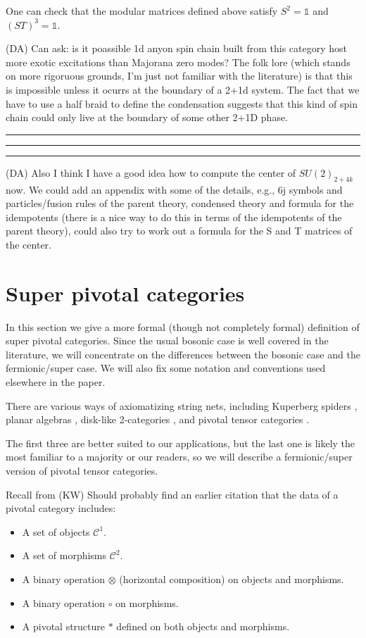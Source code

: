 \documentclass[12pt,a4paper]{article}
\newcommand{\unit}{\mathds{1}}
\newcommand{\mcc}{\mathcal{C}}
\newcommand{\kw}[1]{{\color{kwcolor}\footnotesize{(KW) #1}}}
\newcommand{\kwsep}{\bigskip\hrule\medskip\hrule\medskip\hrule\bigskip}
\newcommand{\dave}[1]{{\color{ao(english)}\footnotesize{(DA) #1}}}
\begin{document}
One can check that the modular matrices defined above satisfy $S^2 =\unit$ and $(ST)^3 = \unit$. 


\dave{ 
Can ask: is it poassible 1d anyon spin chain built from this category host more exotic excitations than Majorana zero modes? 
The folk lore (which stands on more rigoruous grounds, I'm just not familiar with the literature) is that this is impossible unless it ocurrs at the boundary of a 2+1d system.
The fact that we have to use a half braid to define the condensation suggests that this kind of spin chain could only live at the boundary of some other 2+1D phase.
}



\kwsep


\dave{Also I think I have a good idea how to compute the center of $SU(2)_{2+4k}$ now. 
We could add an appendix with some of the details, e.g., 6j symbols and particles/fusion rules of the parent theory, condensed theory and formula for the idempotents (there is a nice way to do this in terms of the idempotents of the parent theory), could also try to work out a formula for the S and T matrices of the center.}







\section{Super pivotal categories}  \label{def_sect}

In this section we give a more formal (though not completely formal) definition of super pivotal categories.
Since the usual bosonic case is well covered in the literature, we will concentrate on
the differences between the bosonic case and the fermionic/super case.
We will also fix some notation and conventions used elsewhere in the paper.


There are various ways of axiomatizing string nets, including Kuperberg spiders \cite{kup_spider}, 
planar algebras \cite{jones_pa},
disk-like 2-categories \cite{blob_paper}, and pivotal tensor categories \cite{kitaev2006}.

The first three are better suited to our applications, but the last one is likely the most familiar to a majority or our readers,
so we will describe a fermionic/super version of pivotal tensor categories.

Recall from 
\cite{kitaev2006}
\kw{Should probably find an earlier citation}
that the data of a pivotal category includes:
\begin{itemize}
\item A set of objects $\mcc^1$.
\item A set of morphisms $\mcc^2$.
\item A binary operation $\otimes$ (horizontal composition) on objects and morphisms.
\item A binary operation $\circ$ on morphisms.
\item A pivotal structure $*$ defined on both objects and morphisms.
\end{itemize}
\end{document}
